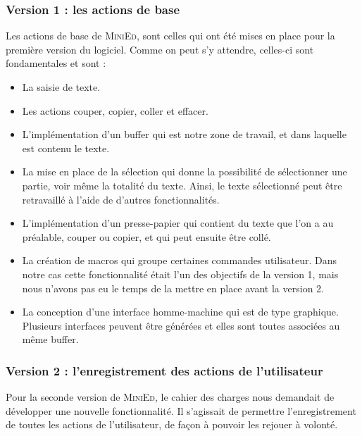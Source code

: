 \documentclass[a4paper]{article}
\begin{document}
		\vspace{0.5cm}

			\subsubsection{Version 1 : les actions de base}

			Les actions de base de \textsc{MiniEd}, sont celles qui ont été mises en place pour la première version du logiciel. Comme on peut s'y attendre, celles-ci sont fondamentales et sont :

			\begin{itemize}
				\item La saisie de texte.

				\item Les actions couper, copier, coller et effacer.

				\item L'implémentation d’un buffer qui est notre zone de travail, et dans laquelle est contenu le texte.

				\item La mise en place de la sélection qui donne la possibilité de sélectionner une partie, voir même la totalité du texte. Ainsi, le texte sélectionné peut être retravaillé à l’aide de d’autres fonctionnalités.

				\item L’implémentation d’un presse-papier qui contient du texte que l’on a au préalable, couper ou copier, et qui peut ensuite être collé.

				\item La création de macros qui groupe certaines commandes utilisateur. Dans notre cas cette fonctionnalité était l'un des objectifs de la version 1, mais nous n'avons pas eu le temps de la mettre en place avant la version 2.

				\item La conception d’une interface homme-machine qui est de type graphique. Plusieurs interfaces peuvent être générées et elles sont toutes associées au même buffer.
			\end{itemize}

			\subsubsection{Version 2 : l'enregistrement des actions de l'utilisateur}

			Pour la seconde version de \textsc{MiniEd}, le cahier des charges nous demandait de développer une nouvelle fonctionnalité. Il s'agissait de permettre l'enregistrement de toutes les actions de l'utilisateur, de façon à pouvoir les rejouer à volonté.
\end{document}
